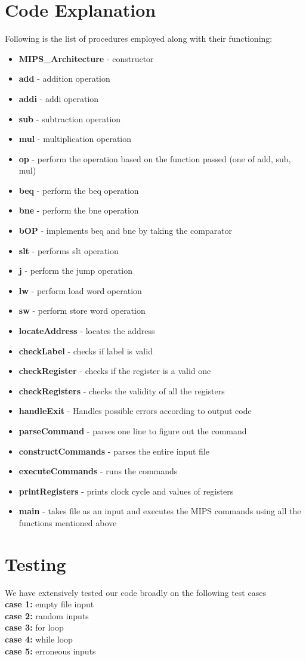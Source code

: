 \documentclass{article}
\begin{document}
\section*{Code Explanation}
Following is the list of procedures employed along with their functioning:
\begin{itemize}
    \item \textbf{MIPS\_Architecture} - constructor
    \item \textbf{add} - addition operation
    \item \textbf{addi} - addi operation
    \item \textbf{sub} - subtraction operation
    \item \textbf{mul} - multiplication operation
    \item \textbf{op} -  perform the operation based on the function passed (one of add, sub, mul)
    \item \textbf{beq} - perform the beq operation
    \item \textbf{bne} - perform the bne operation
    \item \textbf{bOP} - implements beq and bne by taking the comparator
    \item \textbf{slt} - performs slt operation
    \item \textbf{j} -   perform the jump operation
    \item \textbf{lw} - perform load word operation
    \item \textbf{sw} - perform store word operation
    \item \textbf{locateAddress} - locates the address
    \item \textbf{checkLabel} - checks if label is valid
    \item \textbf{checkRegister} - checks if the register is a valid one
    \item \textbf{checkRegisters} - checks the validity of all the registers
    \item \textbf{handleExit} - Handles possible errors according to output code
    \item \textbf{parseCommand} - parses one line to figure out the command
    \item \textbf{constructCommands} - parses the entire input file
    \item \textbf{executeCommands} - runs the commands
    \item \textbf{printRegisters} - prints clock cycle and values of registers
    \item \textbf{main} - takes file as an input and executes the MIPS commands using all the functions mentioned above
\end{itemize}

\section*{Testing}
We have extensively tested our code broadly on the following test cases \\
\textbf{case 1:} empty file input \\
\textbf{case 2:} random inputs \\
\textbf{case 3:} for loop \\
\textbf{case 4:} while loop \\
\textbf{case 5:} erroneous inputs
\end{document}
